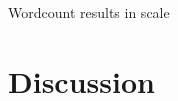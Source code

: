 \documentclass[review]{elsarticle}
\begin{document}
%
%
%
%

Wordcount results in scale

%
%
%
%



\section{Discussion}
\end{document}
